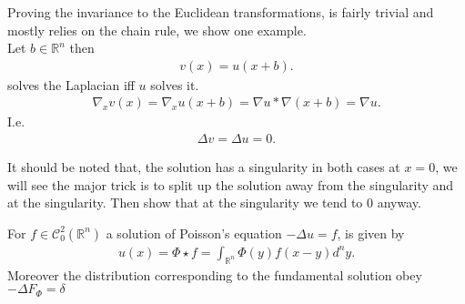 \begin{corollary}
 Proving the invariance to the Euclidean transformations, is fairly trivial and mostly relies on the chain rule, we show one example.\\[1ex]
 Let $b \in  \mathbb{R}^{n} $ then 
 \begin{align*}
  v(x) = u(x+b) 
 .\end{align*}
 solves the Laplacian iff $u$ solves it. 
 \begin{align*}
  \nabla_x v(x) = \nabla_x u(x+b) = \nabla u * \nabla (x+b) = \nabla u
 .\end{align*}
 I.e.
 \begin{align*}
  \Delta  v = \Delta u  = 0
 .\end{align*}
\end{corollary}
\begin{corollary}
It should be noted that, the solution has a singularity in both cases at $x = 0$, we will 
see the major trick is to split up  the solution away from the singularity and at the singularity.
Then show that at the singularity we tend to 0 anyway.
\end{corollary}
\begin{Theorem}[3.2]
 For $f \in  \mathcal{C}_0^{2}(\mathbb{R}^{n} ) $  a solution of Poisson's equation $- \Delta  u  = f$, is given by 
 \begin{align*}
   u(x) = \Phi \star  f = \int_{\mathbb{R}^{n} } \Phi(y)f(x-y) d^{n} y
 .\end{align*}
 Moreover the distribution corresponding to the fundamental solution obey $-\Delta  F_{\Phi } = \delta $  
\end{Theorem}
